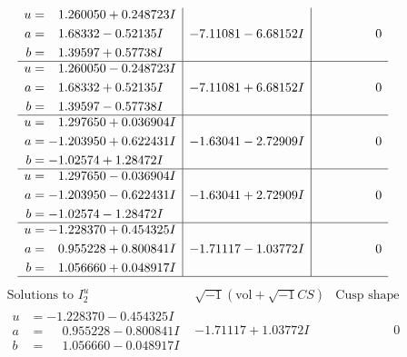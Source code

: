 \documentclass[1p]{elsarticle_modified}
\theoremstyle{definition}
\newcommand{\I}{\sqrt{-1}}
\begin{document}
$$\begin{array}{c|c|c}
\begin{aligned}
u &= \phantom{-}1.260050 + 0.248723 I \\
a &= \phantom{-}1.68332 - 0.52135 I \\
b &= \phantom{-}1.39597 + 0.57738 I\end{aligned}
 & -7.11081 - 6.68152 I & \phantom{-0.000000 } 0 \\ \hline\begin{aligned}
u &= \phantom{-}1.260050 - 0.248723 I \\
a &= \phantom{-}1.68332 + 0.52135 I \\
b &= \phantom{-}1.39597 - 0.57738 I\end{aligned}
 & -7.11081 + 6.68152 I & \phantom{-0.000000 } 0 \\ \hline\begin{aligned}
u &= \phantom{-}1.297650 + 0.036904 I \\
a &= -1.203950 + 0.622431 I \\
b &= -1.02574 + 1.28472 I\end{aligned}
 & -1.63041 - 2.72909 I & \phantom{-0.000000 } 0 \\ \hline\begin{aligned}
u &= \phantom{-}1.297650 - 0.036904 I \\
a &= -1.203950 - 0.622431 I \\
b &= -1.02574 - 1.28472 I\end{aligned}
 & -1.63041 + 2.72909 I & \phantom{-0.000000 } 0 \\ \hline\begin{aligned}
u &= -1.228370 + 0.454325 I \\
a &= \phantom{-}0.955228 + 0.800841 I \\
b &= \phantom{-}1.056660 + 0.048917 I\end{aligned}
 & -1.71117 - 1.03772 I & \phantom{-0.000000 } 0\\
 \hline 
 \end{array}$$\newpage$$\begin{array}{c|c|c}  
\text{Solutions to }I^u_{2}& \I (\text{vol} + \sqrt{-1}CS) & \text{Cusp shape}\\
 \hline 
\begin{aligned}
u &= -1.228370 - 0.454325 I \\
a &= \phantom{-}0.955228 - 0.800841 I \\
b &= \phantom{-}1.056660 - 0.048917 I\end{aligned}
 & -1.71117 + 1.03772 I & \phantom{-0.000000 } 0 \\ \hline\begin{aligned}

\end{aligned}
\end{array}$$
\end{document}
